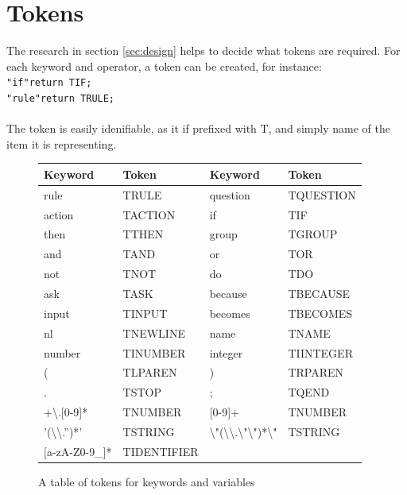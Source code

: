 \documentclass[12pt]{report}
\begin{document}
\section{Tokens}\label{sec:tokens}
The research in section \ref{sec:design} helps to decide what tokens are required.  For each keyword and operator, a token can be created, for instance:\\
\texttt{"if"\quad\quad\quad return TIF;}\\
\texttt{"rule"\quad\quad return TRULE;}\\
\\
The token is easily idenifiable, as it if prefixed with T, and simply name of the item it is representing.
\begin{figure}[H]
	\begin{center}
		\begin{tabular}{ | l | l || l | l |}
			\hline
			\textbf{Keyword} & \textbf{Token} & \textbf{Keyword} & \textbf{Token} \\ \hline
			rule & TRULE & question & TQUESTION \\ \hline
			action & TACTION & if & TIF \\ \hline
			then & TTHEN & group & TGROUP \\ \hline
			and & TAND & or & TOR \\ \hline
			not & TNOT & do & TDO \\ \hline
			ask & TASK & because & TBECAUSE \\ \hline
			input & TINPUT & becomes & TBECOMES \\ \hline
			nl & TNEWLINE & name & TNAME \\ \hline
			number & TINUMBER & integer & TIINTEGER \\ \hline
			( & TLPAREN & ) & TRPAREN \\ \hline
			. & TSTOP & ; & TQEND \\ \hline
			[0-9]+\textbackslash .[0-9]* & TNUMBER & [0-9]+ & TNUMBER \\ \hline
			'(\textbackslash \textbackslash .\textbar ''\textbar [\^{}'\textbackslash n])*' & TSTRING &
			\textbackslash "(\textbackslash\textbackslash .\textbar \textbackslash "\textbackslash 	"\textbar [\^{}\textbackslash n])*\textbackslash " & TSTRING \\ \hline 
			[a-zA-Z\_][a-zA-Z0-9\_]* & TIDENTIFIER  &  &\\ \hline
		\end{tabular}
		\caption{A table of tokens for keywords and variables}\label{fig:token_table}
	\end{center}
\end{figure}
\end{document}
